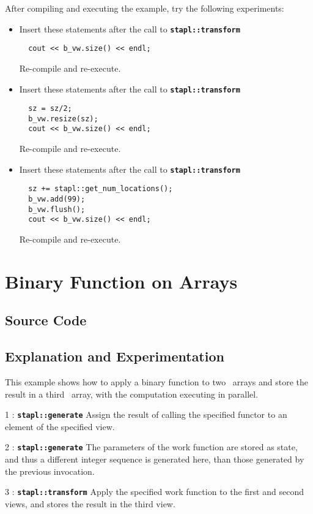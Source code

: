 \documentclass{report}
\begin{document}
After compiling and executing the example, try the following experiments:
\begin{itemize}
\item
Insert these statements after the call to
\texttt{{\bf stapl::transform}}
\begin{verbatim}
  cout << b_vw.size() << endl;
\end{verbatim}
Re-compile and re-execute.
\item
Insert these statements after the call to
\texttt{{\bf stapl::transform}}
\begin{verbatim}
  sz = sz/2;
  b_vw.resize(sz);
  cout << b_vw.size() << endl;
\end{verbatim}
Re-compile and re-execute.
\item
Insert these statements after the call to
\texttt{{\bf stapl::transform}}
\begin{verbatim}
  sz += stapl::get_num_locations();
  b_vw.add(99);
  b_vw.flush();
  cout << b_vw.size() << endl;
\end{verbatim}
Re-compile and re-execute.
\end{itemize}


\pagebreak
\section{Binary Function on Arrays}

\subsection{Source Code}



\subsection{Explanation and Experimentation}

This example shows how to
apply a binary function to two \stapl\ arrays and store the result
in a third \stapl\ array, with the computation executing in parallel.

\begin{hashitemize}

\item 1 : \texttt{{\bf stapl::generate}}
\newline
Assign the result of calling the specified functor to an element
of the specified view.

\item 2 : \texttt{{\bf stapl::generate}}
\newline
The parameters of the work function are stored as state, and thus
a different integer sequence is generated here, than those generated
by the previous invocation.

\item 3 : \texttt{{\bf stapl::transform}}
\newline
Apply the specified work function to the first and second views,
and stores the result in the third view.

\end{hashitemize}
\end{document}
